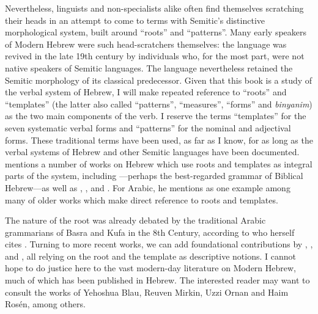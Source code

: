 Nevertheless, linguists and non-specialists alike often find themselves scratching their heads in an attempt to come to terms with Semitic's distinctive morphological system, built around ``roots'' and ``patterns''. Many early speakers of Modern Hebrew were such head-scratchers themselves: the language was revived in the late 19th century by individuals who, for the most part, were not native speakers of Semitic languages. The language nevertheless retained the Semitic morphology of its classical predecessor.
Given that this book is a study of the verbal system of Hebrew, I will make repeated reference to ``roots'' and ``templates'' (the latter also called ``patterns'', ``measures'', ``forms'' and \emph{binyanim}) as the two main components of the verb. I reserve the terms ``templates'' for the seven systematic verbal forms and ``patterns'' for the nominal and adjectival forms. These traditional terms have been used, as far as I know, for as long as the verbal systems of Hebrew and other Semitic languages have been documented. \cite{ussishkin00phd} mentions a number of works on Hebrew which use roots and templates as integral parts of the system, including \cite{gesenius}---perhaps the best-regarded grammar of Biblical Hebrew---as well as \cite{bopp1824}, \cite{ewald1827}, \cite{harris41} and \cite{chomsky51}. For Arabic, he mentions \cite{desacy1810} as one example among many of older works which make direct reference to roots and templates.

The nature of the root was already debated by the traditional Arabic grammarians of Basra and Kufa in the 8th Century, according to \citet[563ff]{borer13oup} who herself cites \cite{owens88}. Turning to more recent works, we can add foundational contributions by \cite{rosen77}, \cite{berman78}, \cite{bolozky78,bolozky99} and \cite{ravid90}, all relying on the root and the template as descriptive notions. I cannot hope to do justice here to the vast modern-day literature on Modern Hebrew, much of which has been published in Hebrew. The interested reader may want to consult the works of Yehoshua Blau, Reuven Mirkin, Uzzi Ornan and Haim Ros\'en, among others.

